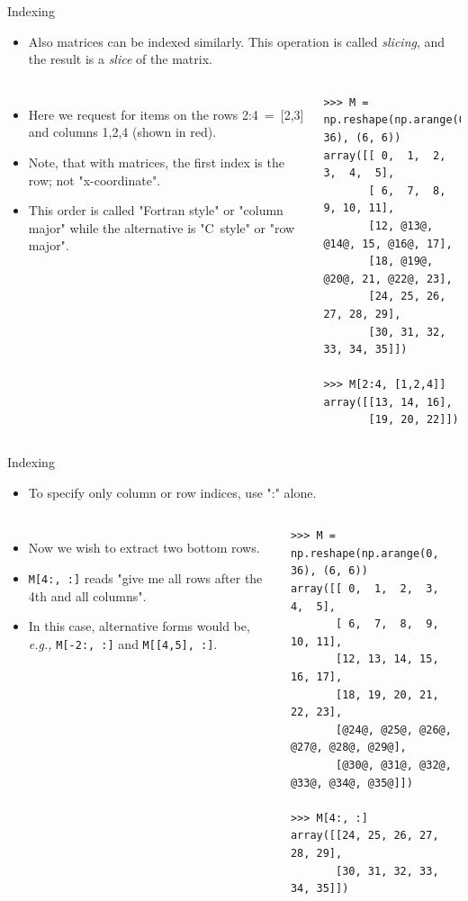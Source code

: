 \documentclass[10pt, aspectratio=169]{beamer} %
\begin{document}
\begin{frame}[fragile,allowframebreaks=0.8]
 {Indexing}
\begin{itemize}
\item Also matrices can be indexed similarly. This operation is called \emph{slicing},
and the result is a \emph{slice} of the matrix.
\end{itemize}
\vspace*{-0.2cm}
\begin{columns}
\hspace*{0.05cm}
\begin{itemize}
\item Here we request for items on the rows 2:4~=~[2,3] and columns 1,2,4 (shown in red).
\item Note, that with matrices, the first index is the row; not "x-coordinate".
\item This order is called "Fortran style" or "column major" while the alternative is 
"C~style" or "row major".
\end{itemize}
\begin{lstlisting}
>>> M = np.reshape(np.arange(0, 36), (6, 6))
array([[ 0,  1,  2,  3,  4,  5],
       [ 6,  7,  8,  9, 10, 11],
       [12, @13@, @14@, 15, @16@, 17],
       [18, @19@, @20@, 21, @22@, 23],
       [24, 25, 26, 27, 28, 29],
       [30, 31, 32, 33, 34, 35]])

>>> M[2:4, [1,2,4]]
array([[13, 14, 16],
       [19, 20, 22]])
\end{lstlisting}
\end{columns}
\end{frame}

\begin{frame}[fragile,allowframebreaks=0.8]
 {Indexing}
\begin{itemize}
\item To specify only column or row indices, use ":" alone.
\end{itemize}
\vspace*{-0.3cm}
\begin{columns}[T]
\hspace*{0.05cm}
\begin{itemize}
\item Now we wish to extract two bottom rows.
\item \verb+M[4:, :]+ reads "give me all rows after the 4th and all columns".
\item In this case, alternative forms would be, \emph{e.g.,} \verb+M[-2:, :]+ and \verb+M[[4,5], :]+.
\end{itemize}
\begin{lstlisting}
>>> M = np.reshape(np.arange(0, 36), (6, 6))
array([[ 0,  1,  2,  3,  4,  5],
       [ 6,  7,  8,  9, 10, 11],
       [12, 13, 14, 15, 16, 17],
       [18, 19, 20, 21, 22, 23],
       [@24@, @25@, @26@, @27@, @28@, @29@],
       [@30@, @31@, @32@, @33@, @34@, @35@]])

>>> M[4:, :]
array([[24, 25, 26, 27, 28, 29],
       [30, 31, 32, 33, 34, 35]])
\end{lstlisting}
\end{columns}
\end{frame}
\end{document}
